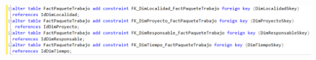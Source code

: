 \documentclass[12pt,letterpaper]{article}
\begin{document}
\begin{center}
\includegraphics[width=19cm]{IMG/sql3-3.png} 
\end{center}
 \newpage
\end{document}
